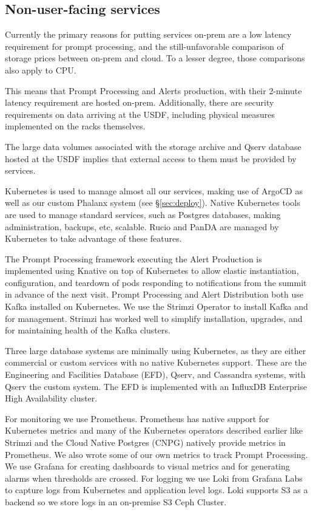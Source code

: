\subsection{Non-user-facing services}

Currently the primary reasons for putting services on-prem are a low
latency requirement for prompt processing, and the still-unfavorable
comparison of storage prices between on-prem and cloud. To a lesser
degree, those comparisons also apply to CPU.

This means that Prompt Processing and Alerts production, with their
2-minute latency requirement are hosted on-prem. Additionally, there
are security requirements on data arriving at the USDF, including
physical measures implemented on the racks themselves.\cite{DMTN-199}

The large data volumes associated with the storage archive and Qserv
database hosted at the USDF implies that external access to them must be
provided by services.

Kubernetes is used to manage almost all our services, making use of
ArgoCD as well as our custom Phalanx system (see \S \ref{sec:deploy}).
Native Kubernetes tools
are used to manage standard services, such as Postgres databases,
making administration, backups, etc, scalable. Rucio and PanDA are
managed by Kubernetes to take advantage of these features.

The Prompt Processing framework executing the Alert Production is implemented
using Knative on top of
Kubernetes to allow elastic instantiation, configuration, and teardown of
pods responding to notifications from the summit in advance of the
next visit.
Prompt Processing and Alert Distribution both use Kafka installed on Kubernetes.
We use the Strimzi Operator to install Kafka and for management.  Strimzi
has worked well to simplify installation, upgrades, and for maintaining
health of the Kafka clusters.

Three large database systems are minimally using Kubernetes, as they
are either commercial or custom services with no native Kubernetes
support. These are the Engineering and Facilities Database (EFD),\cite{2024SPIE13101.59Ftmp}
Qserv, and Cassandra systems, with Qserv the custom system.
The EFD is implemented with an InfluxDB Enterprise High Availability cluster.

For monitoring we use Prometheus.  Prometheus has native support for
Kubernetes metrics and many of the Kubernetes operators described earlier
like Strimzi and the Cloud Native Postgres (CNPG) natively provide metrics in Prometheus. We also
wrote some of our own metrics to track Prompt Processing.
We use Grafana for creating dashboards to visual metrics and for generating alarms when thresholds are crossed.
For logging we use Loki from Grafana Labs to capture logs from Kubernetes
and application level logs.  Loki supports S3 as a backend so we store logs
in an on-premise S3 Ceph Cluster.
